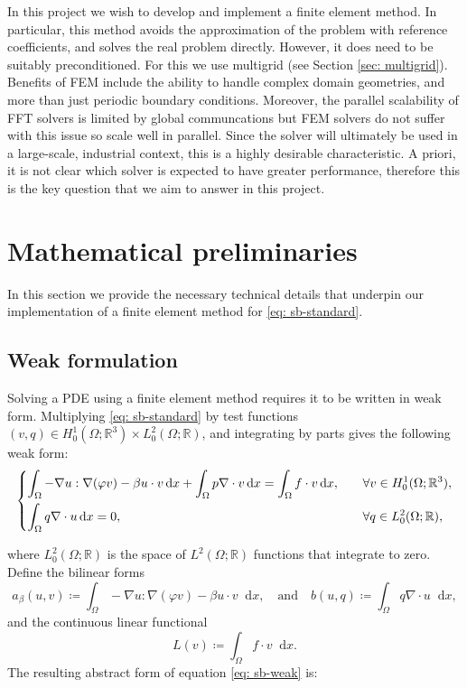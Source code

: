 \documentclass[12pt]{article}
\newcommand{\dd}{\mathop{}\!\mathrm{d}}
\theoremstyle{theorem}
\begin{document}
In this project we wish to develop and implement a finite element method. In particular, this method avoids the approximation of the problem with reference coefficients, and solves the real problem directly. However, it does need to be suitably preconditioned. For this we use multigrid (see Section \ref{sec: multigrid}). Benefits of FEM include the ability to handle complex domain geometries, and more than just periodic boundary conditions. Moreover, the parallel scalability of FFT solvers is limited by global communcations but FEM solvers do not suffer with this issue so scale well in parallel. Since the solver will ultimately be used in a large-scale, industrial context, this is a highly desirable characteristic. A priori, it is not clear which solver is expected to have greater performance, therefore this is the key question that we aim to answer in this project. 

\section{Mathematical preliminaries}\label{sec: maths}

In this section we provide the necessary technical details that underpin our implementation of a finite element method for \eqref{eq: sb-standard}.

\subsection{Weak formulation}

Solving a PDE using a finite element method requires it to be written in weak form. Multiplying \eqref{eq: sb-standard} by test functions $(v, q) \in H^1_0(\Omega; \mathbb{R}^3) \times L^2_0(\Omega; \mathbb{R})$, and integrating by parts gives the following weak form:
\begin{equation}\label{eq: sb-weak}
    \begin{dcases}
        \int_\Omega -\nabla u : \nabla(\varphi v) - \beta u \cdot v \dd x + \int_\Omega p \nabla \cdot v \dd x = \int_\Omega f \cdot v  \dd x, \quad &\forall v \in H^1_0(\Omega; \mathbb{R}^3),\\
        \int_\Omega q \nabla \cdot u \dd x = 0, \quad &\forall q \in L^2_0(\Omega; \mathbb{R}),
    \end{dcases}
\end{equation}

where $L^2_0(\Omega; \mathbb{R})$ is the space of $L^2(\Omega; \mathbb{R})$ functions that integrate to zero. Define the bilinear forms
\begin{equation}\label{eq: bilinear-forms}
    a_\beta(u, v) \coloneqq \int_\Omega -\nabla u : \nabla(\varphi v) - \beta u \cdot v \dd x, \quad \text{and} \quad b(u, q) \coloneqq \int_\Omega q \nabla \cdot u \dd x,
\end{equation}
and the continuous linear functional
\begin{equation}\label{eq: cts-lin-func}
    L(v) \coloneqq \int_\Omega f \cdot v \dd x.
\end{equation}
The resulting abstract form of equation \eqref{eq: sb-weak} is: 
\end{document}
